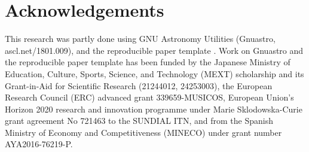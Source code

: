 \documentclass[10pt, twocolumn]{article}
\begin{document}
\section{Acknowledgements}

This research was partly done using GNU Astronomy Utilities (Gnuastro,
ascl.net/1801.009), and the reproducible paper template
\projectversion. Work on Gnuastro and the reproducible paper template has
been funded by the Japanese Ministry of Education, Culture, Sports,
Science, and Technology (MEXT) scholarship and its Grant-in-Aid for
Scientific Research (21244012, 24253003), the European Research Council
(ERC) advanced grant 339659-MUSICOS, European Union’s Horizon 2020 research
and innovation programme under Marie Sklodowska-Curie grant agreement No
721463 to the SUNDIAL ITN, and from the Spanish Ministry of Economy and
Competitiveness (MINECO) under grant number AYA2016-76219-P.



\printbibliography

\end{document}
